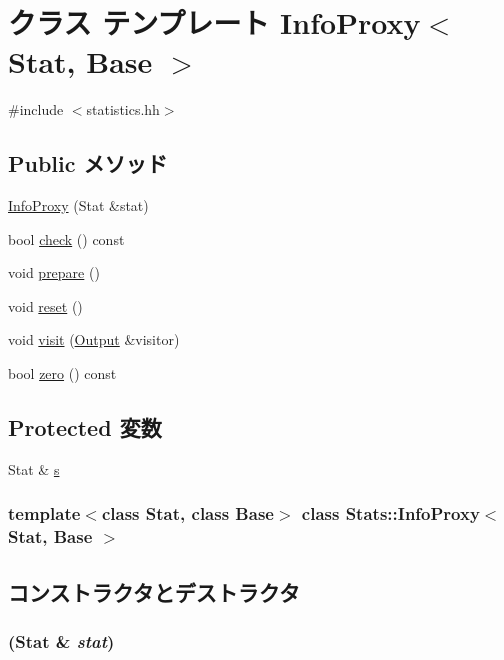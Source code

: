 \hypertarget{classStats_1_1InfoProxy}{
\section{クラス テンプレート InfoProxy$<$ Stat, Base $>$}
\label{classStats_1_1InfoProxy}
}


{\ttfamily \#include $<$statistics.hh$>$}\subsection*{Public メソッド}
\begin{DoxyCompactItemize}
\item 
\hyperlink{classStats_1_1InfoProxy_a23f770992e9cff4703929342f2ebb27f}{InfoProxy} (Stat \&stat)
\item 
bool \hyperlink{classStats_1_1InfoProxy_a6ecddb2c44556b7acbc1723a968ff8bb}{check} () const 
\item 
void \hyperlink{classStats_1_1InfoProxy_a1825b40ca3bc3a1ba67fdb58fac5015c}{prepare} ()
\item 
void \hyperlink{classStats_1_1InfoProxy_ad20897c5c8bd47f5d4005989bead0e55}{reset} ()
\item 
void \hyperlink{classStats_1_1InfoProxy_adb3e1761782ea843b4400aeeaa6c4887}{visit} (\hyperlink{structStats_1_1Output}{Output} \&visitor)
\item 
bool \hyperlink{classStats_1_1InfoProxy_a4e72b01b727d3165e75cba84eb507491}{zero} () const 
\end{DoxyCompactItemize}
\subsection*{Protected 変数}
\begin{DoxyCompactItemize}
\item 
Stat \& \hyperlink{classStats_1_1InfoProxy_a760b7b0da63b189c3cb0f268b2af0d2c}{s}
\end{DoxyCompactItemize}
\subsubsection*{template$<$class Stat, class Base$>$ class Stats::InfoProxy$<$ Stat, Base $>$}



\subsection{コンストラクタとデストラクタ}
\hypertarget{classStats_1_1InfoProxy_a23f770992e9cff4703929342f2ebb27f}{
\subsubsection[{InfoProxy}]{ (Stat \& {\em stat})}}
\label{classStats_1_1InfoProxy_a23f770992e9cff4703929342f2ebb27f}



